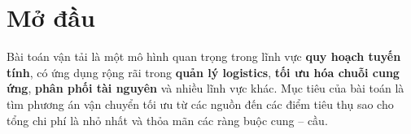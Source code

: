\documentclass[oneside, a4paper]{book} %
\theoremstyle{plain}
\theoremstyle{definition}
\theoremstyle{remark}
\begin{document}
	
\thispagestyle{empty}
\setcounter{page}{1}%





\newpage


%

\newpage




\newpage





\tableofcontents %
\pagestyle{myheadings}

\newpage

\thispagestyle{empty}
\setcounter{page}{1}



\newpage
\listoftables
\thispagestyle{empty}
%

\newpage
\renewcommand{\listfigurename}{Danh sách hình ảnh}
\listoffigures


{}

\clearpage

\chapter*{Mở đầu}
Bài toán vận tải là một mô hình quan trọng trong lĩnh vực \textbf{quy hoạch tuyến tính}, có ứng dụng rộng rãi trong \textbf{quản lý logistics}, \textbf{tối ưu hóa chuỗi cung ứng}, \textbf{phân phối tài nguyên} và nhiều lĩnh vực khác. Mục tiêu của bài toán là tìm phương án vận chuyển tối ưu từ các nguồn đến các điểm tiêu thụ sao cho tổng chi phí là nhỏ nhất và thỏa mãn các ràng buộc cung – cầu.
\end{document}
